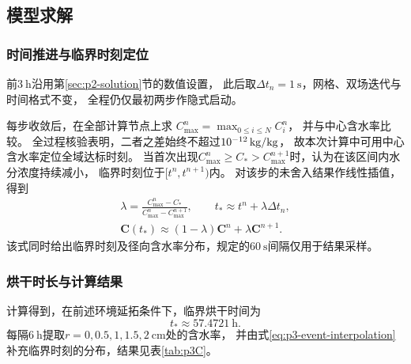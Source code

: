 \subsection{模型求解}
\label{sec:p3-solution}

\subsubsection{时间推进与临界时刻定位}

前$3\ \mathrm{h}$沿用第\ref{sec:p2-solution}节的数值设置，
此后取$\Delta t_n=1\ \mathrm{s}$，网格、双场迭代与时间格式不变，
全程仍仅最初两步作隐式启动。

每步收敛后，在全部计算节点上求
$C_{\max}^{n}=\max_{0\le i\le N}C_i^{n}$，
并与中心含水率比较。
全过程核验表明，二者之差始终不超过$10^{-12}\,\mathrm{kg/kg}$，
故本次计算中可用中心含水率定位全域达标时刻。
当首次出现$C_{\max}^{n}\ge C_*>C_{\max}^{n+1}$时，认为在该区间内水分浓度持续减小，
临界时刻位于$[t^n,t^{n+1})$内。
对该步的未舍入结果作线性插值，得到
\begin{equation}
\begin{gathered}
  \lambda=\frac{C_{\max}^{n}-C_*}
                 {C_{\max}^{n}-C_{\max}^{n+1}},
  \qquad t_*\approx t^n+\lambda\Delta t_n,\\
  \boldsymbol C(t_*)\approx
    (1-\lambda)\boldsymbol C^n+\lambda\boldsymbol C^{n+1}.
\end{gathered}
\label{eq:p3-event-interpolation}
\end{equation}
该式同时给出临界时刻及径向含水率分布，规定的$60\ \mathrm{s}$间隔仅用于结果采样。

\subsubsection{烘干时长与计算结果}

计算得到，在前述环境延拓条件下，临界烘干时间为
\begin{equation*}
  \boxed{t_*\approx57.4721\ \mathrm{h}}.
\end{equation*}
每隔$6\ \mathrm{h}$提取$r=0,0.5,1,1.5,2\ \mathrm{cm}$处的含水率，
并由式\eqref{eq:p3-event-interpolation}补充临界时刻的分布，结果见表\ref{tab:p3C}。

